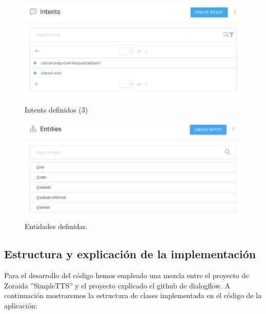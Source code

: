 \begin{figure}[H] %
	\centering
	\includegraphics[scale=0.3]{imagenes/intents3.png}  %
	\caption{Intents definidos (3)}
\end{figure}


\begin{figure}[H] %
	\centering
	\includegraphics[scale=0.3]{imagenes/entidades.png}  %
	\caption{Entidades definidas.}
\end{figure}


\subsection{Estructura y explicación de la implementación}
Para el desarrollo del código hemos empleado una mezcla entre el proyecto de Zoraida ''SimpleTTS'' y el proyecto explicado el github de dialogflow. \cite{git}
A continuación mostraremos la estructura de clases implementada en el código de la aplicación:

